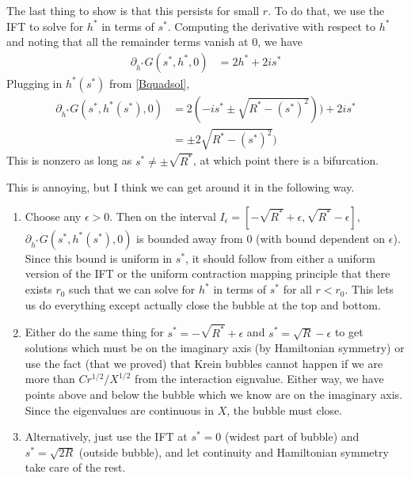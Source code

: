 \documentclass[thesis.tex]{subfiles}
\begin{document}
The last thing to show is that this persists for small $r$. To do that, we use the IFT to solve for $h^*$ in terms of $s^*$. Computing the derivative with respect to $h^*$ and noting that all the remainder terms vanish at 0, we have
\begin{align*}
\partial_{h^*} G(s^*, h^*, 0) 
&= 2 h^* + 2 i s^*
\end{align*}
Plugging in $h^*(s^*)$ from \cref{Bquadsol},
\begin{align*}
\partial_{h^*} G(s^*, h^*(s^*), 0) 
&= 2 (-i s^* \pm \sqrt{R^* - (s^*)^2 })) + 2 i s^* \\
&= \pm 2 \sqrt{R^* - (s^*)^2 })
\end{align*}
This is nonzero as long as $s^* \neq \pm \sqrt{R^*}$, at which point there is a bifurcation. 

This is annoying, but I think we can get around it in the following way.
\begin{enumerate}
\item Choose any $\epsilon > 0$. Then on the interval $I_\epsilon = [-\sqrt{R^*} + \epsilon, \sqrt{R^*} - \epsilon]$, $\partial_{h^*} G(s^*, h^*(s^*), 0)$ is bounded away from 0 (with bound dependent on $\epsilon$). Since this bound is uniform in $s^*$, it should follow from either a uniform version of the IFT or the uniform contraction mapping principle that there exists $r_0$ such that we can solve for $h^*$ in terms of $s^*$ for all $r < r_0$. This lets us do everything except actually close the bubble at the top and bottom.

\item Either do the same thing for $s^* = -\sqrt{R^*} + \epsilon$ and $s^* = \sqrt{R} - \epsilon$ to get solutions which must be on the imaginary axis (by Hamiltonian symmetry) or use the fact (that we proved) that Krein bubbles cannot happen if we are more than $C r^{1/2}/X^{1/2}$ from the interaction eignvalue. Either way, we have points above and below the bubble which we know are on the imaginary axis. Since the eigenvalues are continuous in $X$, the bubble must close.

\item Alternatively, just use the IFT at $s^* = 0$ (widest part of bubble) and $s^* = \sqrt{2R}$ (outside bubble), and let continuity and Hamiltonian symmetry take care of the rest.

\end{enumerate} 
\end{document}
